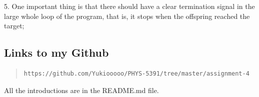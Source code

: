 \documentclass[12pt, letterpaper]{article} %
\begin{document}
5. One important thing is that there should have a clear termination signal in the large whole loop of the program, that is, it stops when
the offspring reached the target;



\subsection{Links to my Github} %

\begin{quote} 
\begin{verbatim}
https://github.com/Yukiooooo/PHYS-5391/tree/master/assignment-4
\end{verbatim} %
\end{quote} %

All the introductions are in the README.md file. 


\end{document}
